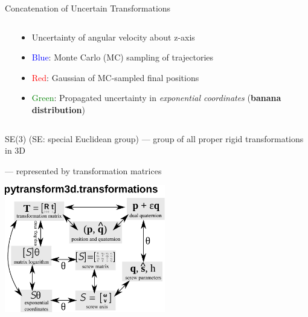 \documentclass[14pt,aspectratio=169]{beamer}
\begin{document}
\begin{frame}[fragile]{Concatenation of Uncertain Transformations}
\begin{columns}
\begin{column}{0.4\textwidth}
{}
\end{column}
\begin{column}{0.55\textwidth}
\begin{itemize}
\item Uncertainty of angular velocity about z-axis
\item \textcolor{blue}{Blue}: Monte Carlo (MC) sampling of trajectories
\item<2-> \textcolor{red}{Red}: Gaussian of MC-sampled final positions
\item<3-> \textcolor{green}{Green}: Propagated uncertainty in \textit{exponential coordinates}
(\textbf{banana distribution})
\end{itemize}
\end{column}
\end{columns}
\end{frame}

\begin{frame}{SE(3) (SE: special Euclidean group)}
--- group of all proper rigid transformations in 3D

--- represented by transformation matrices

\vfill

\begin{center}
\includegraphics[width=7cm]{images/transformations}
\end{center}
\end{frame}
\end{document}

